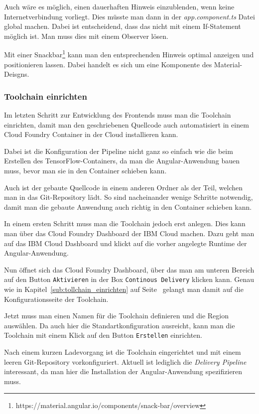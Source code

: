 Auch wäre es möglich, einen dauerhaften Hinweis einzublenden, wenn keine Internetverbindung vorliegt. Dies müsste man
dann in der \textit{app.component.ts} Datei global machen. Dabei ist entscheidend, dass das nicht mit einem If-Statement
möglich ist. Man muss dies mit einem Observer lösen.

Mit einer Snackbar\footnote{https://material.angular.io/components/snack-bar/overview} kann man den entsprechenden
Hinweis optimal anzeigen und positionieren lassen. Dabei handelt es sich um eine Komponente des Material-Deisgns.

\subsubsection{Toolchain einrichten}
\label{subsec:toolchain_einrichten}
Im letzten Schritt zur Entwicklung des Frontends muss man die Toolchain einrichten, damit man den geschriebenen
Quellcode auch automatisiert in einem Cloud Foundry Container in der Cloud installieren kann.

Dabei ist die Konfiguration der Pipeline nicht ganz so einfach wie die beim Erstellen des TensorFlow-Containers, da man
die Angular-Anwendung bauen muss, bevor man sie in den Container schieben kann.

Auch ist der gebaute Quellcode in einem anderen Ordner als der Teil, welchen man in das Git-Repository lädt. So sind
nacheinander wenige Schritte notwendig, damit man die gebaute Anwendung auch richtig in den Container schieben kann.

In einem ersten Schritt muss man die Toolchain jedoch erst anlegen. Dies kann man über das Cloud Foundry Dashboard der
IBM Cloud machen. Dazu geht man auf das IBM Cloud Dashboard und klickt auf die vorher angelegte Runtime der
Angular-Anwendung.

Nun öffnet sich das Cloud Foundry Dashboard, über das man am unteren Bereich auf den Button \texttt{Aktivieren} in der
Box \texttt{Continous Delivery} klicken kann. Genau wie in Kapitel~\ref{sub:tollchain_einrichten} auf
Seite~\pageref{sub:tollchain_einrichten} gelangt man damit auf die Konfigurationsseite der Toolchain.

Jetzt muss man einen Namen für die Toolchain definieren und die Region auswählen. Da auch hier die Standartkonfiguration
ausreicht, kann man die Toolchain mit einem Klick auf den Button \texttt{Erstellen} einrichten.

Nach einem kurzen Ladevorgang ist die Toolchain eingerichtet und mit einem leeren Git-Repository vorkonfiguriert.
Aktuell ist lediglich die \textit{Delivery Pipeline} interessant, da man hier die Installation der Angular-Anwendung
spezifizieren muss.

